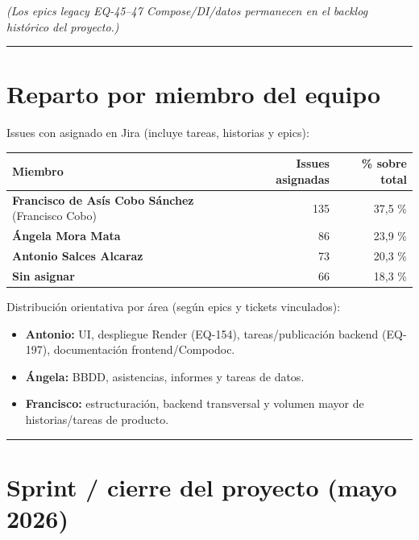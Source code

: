 \documentclass[
  spanish,
  11pt,
]{report}
\newcounter{none} %
\providecommand{\tightlist}{%
  \setlength{\itemsep}{0pt}\setlength{\parskip}{0pt}}
\begin{document}
\emph{(Los epics legacy EQ-45--47 Compose/DI/datos permanecen en el
backlog histórico del proyecto.)}

\begin{center}\rule{0.5\linewidth}{0.5pt}\end{center}

\section{Reparto por miembro del
equipo}\label{reparto-por-miembro-del-equipo}

Issues con asignado en Jira (incluye tareas, historias y epics):

{\def\LTcaptype{none} %
\begin{longtable}[]{@{}lrr@{}}
\toprule\noalign{}
Miembro & Issues asignadas & \% sobre total \\
\midrule\noalign{}
\endhead
\bottomrule\noalign{}
\endlastfoot
\textbf{Francisco de Asís Cobo Sánchez} (Francisco Cobo) & 135 & 37,5
\% \\
\textbf{Ángela Mora Mata} & 86 & 23,9 \% \\
\textbf{Antonio Salces Alcaraz} & 73 & 20,3 \% \\
\textbf{Sin asignar} & 66 & 18,3 \% \\
\end{longtable}
}

Distribución orientativa por área (según epics y tickets vinculados):

\begin{itemize}
\tightlist
\item
  \textbf{Antonio:} UI, despliegue Render (EQ-154), tareas/publicación
  backend (EQ-197), documentación frontend/Compodoc.
\item
  \textbf{Ángela:} BBDD, asistencias, informes y tareas de datos.
\item
  \textbf{Francisco:} estructuración, backend transversal y volumen
  mayor de historias/tareas de producto.
\end{itemize}

\begin{center}\rule{0.5\linewidth}{0.5pt}\end{center}

\section{Sprint / cierre del proyecto (mayo
2026)}\label{sprint-cierre-del-proyecto-mayo-2026}
\end{document}
